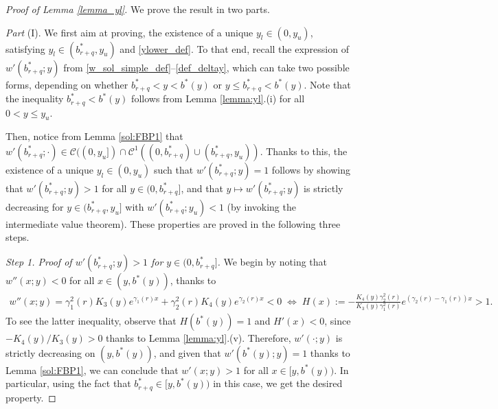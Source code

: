 \documentclass[11pt]{article} %
\numberwithin{komcounter}{section}
\numberwithin{equation}{section}
\numberwithin{theorem}{section}
\begin{document}
\begin{proof}[Proof of Lemma \ref{lemma_yl}]
We prove the result in two parts. 

\vspace{1mm}
{\it Part} (I). We first aim at proving, the existence of a unique $y_l\in (0,y_u)$, satisfying $y_l\in (b^*_{r+q},y_u)$ and \eqref{ylower_def}. 
To that end, recall the expression of $w'(b^*_{r+q}; y)$ from \eqref{w_sol_simple_def}--\eqref{def_deltay}, which can take two possible forms, depending on whether $b^*_{r+q} < y < b^*(y)$ or $y \leq b^*_{r+q} < b^*(y)$.
Note that the inequality $b^*_{r+q} < b^*(y)$ follows from Lemma \ref{lemma:yl}.(i) for all $0 < y \leq y_u$. 

Then, notice from Lemma \ref{sol:FBP1} that 
$w'(b^*_{r+q}; \cdot) \in \mathcal{C}((0, y_u]) \cap \mathcal{C}^1((0, b^*_{r+q}) \cup (b^*_{r+q}, y_u))$.
Thanks to this, the existence of a unique $y_l \in (0,y_u)$ such that $w'(b^*_{r+q}; y)=1$ follows by showing that $w'(b^*_{r+q}; y) > 1$ for all $y \in (0, b^*_{r+q}]$, and that $y \mapsto w'(b^*_{r+q}; y)$ is strictly decreasing for $y \in (b^*_{r+q}, y_u]$ with $w'(b^*_{r+q}; y_u)<1$ (by invoking the intermediate value theorem). 
These properties are proved in the following three steps.

\vspace{1mm}
{\it Step 1. Proof of $w'(b^*_{r+q}; y) > 1$ for $y \in (0, b^*_{r+q}]$.}
We begin by noting that $w''(x; y) < 0$ for all $x \in (y, b^*(y))$, thanks to 
\begin{align} \label{help_ineq}
w''(x; y) 
= \gamma_1^2(r) K_3(y)e^{\gamma_1(r)x} + \gamma_2^2(r) K_4(y)e^{\gamma_2(r)x}
< 0 
\; \Leftrightarrow \;
H(x):=-\frac{K_4(y)\gamma_2^2(r)}{K_3(y)\gamma_1^2(r)}e^{(\gamma_2(r) - \gamma_1(r))x} > 1.
\end{align}
To see the latter inequality, observe that $H(b^*(y))=1$ and $H'(x) < 0$, since $-{K_4(y)}/{K_3(y)} > 0$ thanks to Lemma \ref{lemma:yl}.(v).
Therefore, $w'(\cdot;y)$ is strictly decreasing on $(y, b^*(y))$, and given that $w'(b^*(y); y) = 1$ thanks to Lemma \ref{sol:FBP1}, we can conclude that $w'(x; y) > 1$ for all $x \in [y, b^*(y))$. 
In particular, using the fact that $b^*_{r+q} \in [y, b^*(y))$ in this case, we get the desired property. 


\end{proof}
\end{document}
